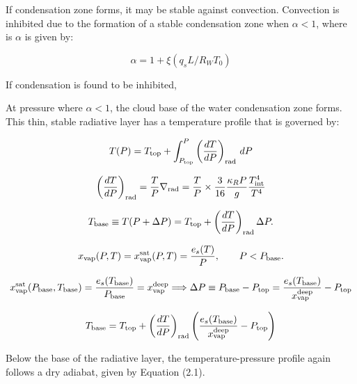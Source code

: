 \documentclass[11pt]{ucscthesisbs}
\begin{document}
If condensation zone forms, it may be stable against convection. Convection is inhibited due to the formation of a stable condensation zone when $\alpha < 1$, where is $\alpha$ \citep{friedson_2017} is given by:

\begin{equation}
  \alpha = 1 + \xi (q_{s} L / R_{W} T_{0}) 
\end{equation}

If condensation is found to be inhibited,  

At pressure where $\alpha < 1$, the cloud base of the water condensation zone forms. This thin, stable radiative layer has a temperature profile that is governed by:

\begin{equation}
	T(P) = T_{\rm top} + \int_{P_{\rm top}}^P\left(\frac{dT}{dP}\right)_{\rm rad}\,d P
\end{equation}

\begin{equation}
  \left(\frac{dT}{dP}\right)_{\rm rad}=\frac{T}{P}\nabla_{\rm rad} = \frac{T}{P}\times\frac{3}{16}\frac{\kappa_R P}{g}\frac{T_{\rm int}^4}{T^4}
\end{equation}

\begin{equation}
	T_{\rm base}\equiv T(P+\Delta P) = T_{\rm top} + \left(\frac{dT}{dP}\right)_{\rm rad}\Delta P.
\end{equation}

\begin{equation}
	x_{\rm vap}(P, T) = x_{\rm vap}^{\rm sat}(P, T) = \frac{e_s(T)}{P}, \qquad P<P_{\rm base}.
\end{equation}

\begin{equation}
x_{\rm vap}^{\rm sat}(P_{\rm base}, T_{\rm base}) = \frac{e_s(T_{\rm base})}{P_{\rm base}}=x_{\rm vap}^{\rm deep}
\Longrightarrow \Delta P \equiv P_{\rm base}-P_{\rm top} = \frac{e_s(T_{\rm base})}{x_{\rm vap}^{\rm deep}} - P_{\rm top}
\end{equation}

\begin{equation}
	T_{\rm base} = T_{\rm top} + \left(\frac{dT}{dP}\right)_{\rm rad}\left(\frac{e_s(T_{\rm base})}{x_{\rm vap}^{\rm deep}} - P_{\rm top}\right)
\end{equation}

Below the base of the radiative layer, the temperature-pressure profile again follows a dry adiabat, given by Equation (2.1).
\end{document}
